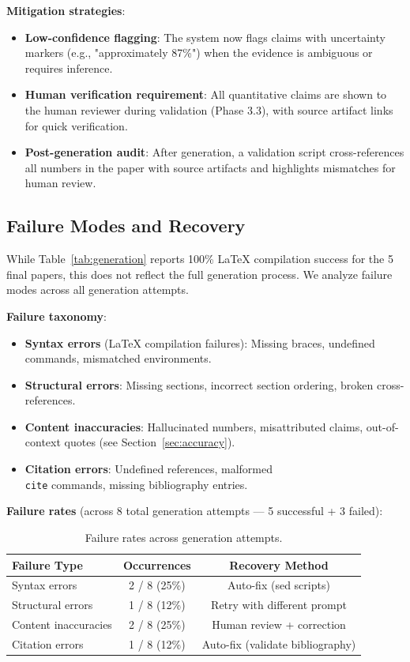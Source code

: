 \textbf{Mitigation strategies}:
\begin{itemize}
\item \textbf{Low-confidence flagging}: The system now flags claims with uncertainty markers (e.g., "approximately 87\%") when the evidence is ambiguous or requires inference.
\item \textbf{Human verification requirement}: All quantitative claims are shown to the human reviewer during validation (Phase 3.3), with source artifact links for quick verification.
\item \textbf{Post-generation audit}: After generation, a validation script cross-references all numbers in the paper with source artifacts and highlights mismatches for human review.
\end{itemize}

\subsection{Failure Modes and Recovery}
\label{sec:failures}

While Table~\ref{tab:generation} reports 100\% LaTeX compilation success for the 5 final papers, this does not reflect the full generation process. We analyze failure modes across all generation attempts.

\textbf{Failure taxonomy}:
\begin{itemize}
\item \textbf{Syntax errors} (LaTeX compilation failures): Missing braces, undefined commands, mismatched environments.
\item \textbf{Structural errors}: Missing sections, incorrect section ordering, broken cross-references.
\item \textbf{Content inaccuracies}: Hallucinated numbers, misattributed claims, out-of-context quotes (see Section~\ref{sec:accuracy}).
\item \textbf{Citation errors}: Undefined references, malformed \texttt{\\cite} commands, missing bibliography entries.
\end{itemize}

\textbf{Failure rates} (across 8 total generation attempts — 5 successful + 3 failed):
\begin{table}[h]
\centering
\caption{Failure rates across generation attempts.}
\begin{tabular}{lcc}
\toprule
Failure Type & Occurrences & Recovery Method \\
\midrule
Syntax errors & 2 / 8 (25\%) & Auto-fix (sed scripts) \\
Structural errors & 1 / 8 (12\%) & Retry with different prompt \\
Content inaccuracies & 2 / 8 (25\%) & Human review + correction \\
Citation errors & 1 / 8 (12\%) & Auto-fix (validate bibliography) \\
\bottomrule
\end{tabular}
\end{table}

